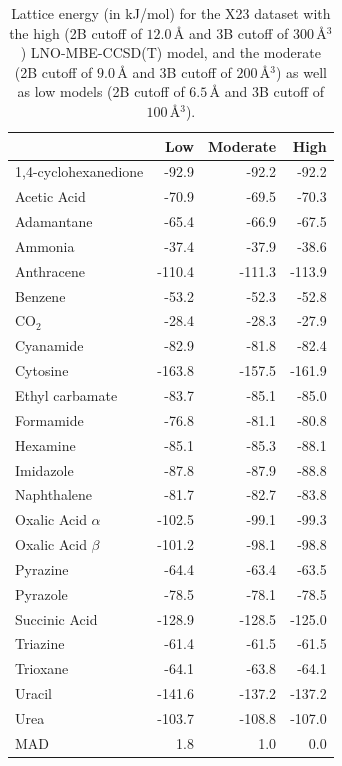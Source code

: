 \begin{table}[h]

\caption{\label{tab:x23_smaller_models}Lattice energy (in kJ/mol) for the X23 dataset with the high (2B cutoff of $12.0\,$\AA{} and 3B cutoff of $300\,$\AA{}$^3$) LNO-MBE-CCSD(T) model, and the moderate (2B cutoff of $9.0\,$\AA{} and 3B cutoff of $200\,$\AA{}$^3$) as well as low models (2B cutoff of $6.5\,$\AA{} and 3B cutoff of $100\,$\AA{}$^3$).}
\begin{tabular}{lrrr}
\toprule
 & Low & Moderate & High \\ 
\midrule
1,4-cyclohexanedione & -92.9 & -92.2 & -92.2 \\
Acetic Acid & -70.9 & -69.5 & -70.3 \\
Adamantane & -65.4 & -66.9 & -67.5 \\
Ammonia & -37.4 & -37.9 & -38.6 \\
Anthracene & -110.4 & -111.3 & -113.9 \\
Benzene & -53.2 & -52.3 & -52.8 \\
CO$_2$ & -28.4 & -28.3 & -27.9 \\
Cyanamide & -82.9 & -81.8 & -82.4 \\
Cytosine & -163.8 & -157.5 & -161.9 \\
Ethyl carbamate & -83.7 & -85.1 & -85.0 \\
Formamide & -76.8 & -81.1 & -80.8 \\
Hexamine & -85.1 & -85.3 & -88.1 \\
Imidazole & -87.8 & -87.9 & -88.8 \\
Naphthalene & -81.7 & -82.7 & -83.8 \\
Oxalic Acid $\alpha$ & -102.5 & -99.1 & -99.3 \\
Oxalic Acid $\beta$ & -101.2 & -98.1 & -98.8 \\
Pyrazine & -64.4 & -63.4 & -63.5 \\
Pyrazole & -78.5 & -78.1 & -78.5 \\
Succinic Acid & -128.9 & -128.5 & -125.0 \\
Triazine & -61.4 & -61.5 & -61.5 \\
Trioxane & -64.1 & -63.8 & -64.1 \\
Uracil & -141.6 & -137.2 & -137.2 \\
Urea & -103.7 & -108.8 & -107.0 \\
MAD & 1.8 & 1.0 & 0.0 \\
\bottomrule
\end{tabular}

\end{table}